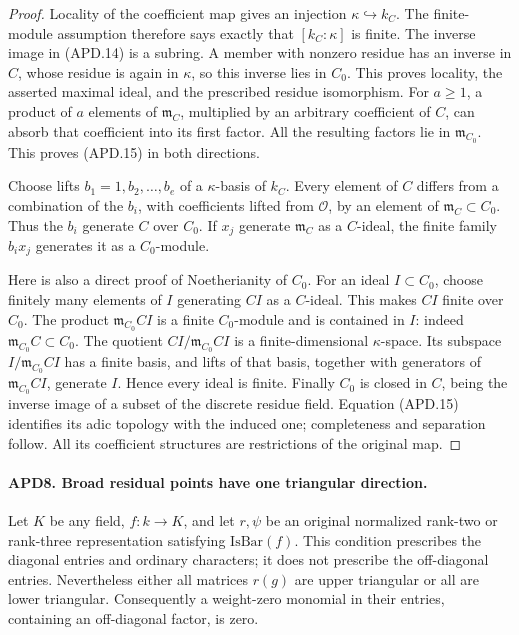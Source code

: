 \begin{proof}
Locality of the coefficient map gives an injection
\(\kappa\hookrightarrow k_C\).  The finite-module assumption
therefore says exactly that \([k_C:\kappa]\) is finite.
The inverse image in (APD.14) is a subring.  A member with nonzero
residue has an inverse in \(C\), whose residue is again in
\(\kappa\), so this inverse lies in \(C_0\).  This proves
locality, the asserted maximal ideal, and the prescribed residue
isomorphism.  For \(a\ge1\), a product of \(a\) elements
of \(\mathfrak m_C\), multiplied by an arbitrary coefficient
of \(C\), can absorb that coefficient into its first factor.
All the resulting factors lie in \(\mathfrak m_{C_0}\).
This proves (APD.15) in both directions.

Choose lifts \(b_1=1,b_2,\ldots,b_e\) of a
\(\kappa\)-basis of \(k_C\).  Every element of \(C\)
differs from a combination of the \(b_i\), with coefficients
lifted from \(\mathcal O\), by an element of
\(\mathfrak m_C\subset C_0\).  Thus the \(b_i\) generate
\(C\) over \(C_0\).  If \(x_j\) generate \(\mathfrak m_C\)
as a \(C\)-ideal, the finite family \(b_ix_j\) generates it
as a \(C_0\)-module.

Here is also a direct proof of Noetherianity of \(C_0\).
For an ideal \(I\subset C_0\), choose finitely many elements
of \(I\) generating \(CI\) as a \(C\)-ideal.  This makes
\(CI\) finite over \(C_0\).  The product
\(\mathfrak m_{C_0}CI\) is a finite \(C_0\)-module and is
contained in \(I\): indeed \(\mathfrak m_{C_0}C\subset C_0\).
The quotient \(CI/\mathfrak m_{C_0}CI\) is a finite-dimensional
\(\kappa\)-space.  Its subspace
\(I/\mathfrak m_{C_0}CI\) has a finite basis, and lifts of
that basis, together with generators of
\(\mathfrak m_{C_0}CI\), generate \(I\).  Hence every ideal
is finite.  Finally \(C_0\) is closed in \(C\), being the
inverse image of a subset of the discrete residue field.
Equation (APD.15) identifies its adic topology with the induced
one; completeness and separation follow.  All its coefficient
structures are restrictions of the original map.
\end{proof}

\paragraph{APD8. Broad residual points have one triangular direction.}
\label{claim:APD8}
Let \(K\) be any field, \(f:k\to K\), and let
\(r,\psi\) be an original normalized rank-two or rank-three
representation satisfying \(\mathrm{IsBar}(f)\).  This condition
prescribes the diagonal entries and ordinary characters; it does
not prescribe the off-diagonal entries.  Nevertheless either all
matrices \(r(g)\) are upper triangular or all are lower triangular.
Consequently a weight-zero monomial in their entries, containing
an off-diagonal factor, is zero.

